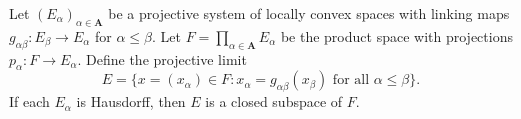 Let $(E_\alpha)_{\alpha \in \mathbf{A}}$ be a projective system of locally convex spaces with linking maps $g_{\alpha \beta}: E_\beta \to E_\alpha$ for $\alpha \leq \beta$. Let $F = \prod_{\alpha \in \mathbf{A}} E_\alpha$ be the product space with projections $p_\alpha: F \to E_\alpha$. Define the projective limit
$$E = \{x = (x_\alpha) \in F : x_\alpha = g_{\alpha \beta}(x_\beta) \text{ for all } \alpha \leq \beta\}.$$
If each $E_\alpha$ is Hausdorff, then $E$ is a closed subspace of $F$.
